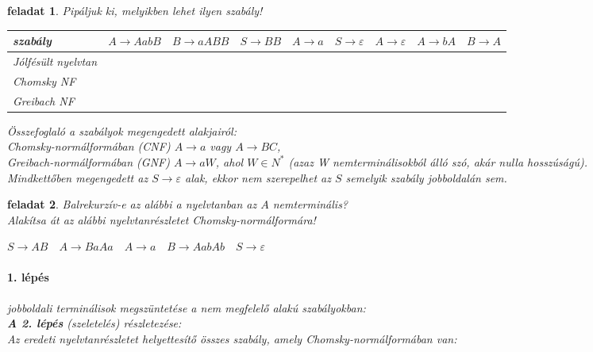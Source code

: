 \documentclass[a4paper]{article}
\newtheorem{feladat}{feladat}[section]
\begin{document}
\newpage
\begin{feladat}{}
    Pipáljuk ki, melyikben lehet ilyen szabály!

    \begin{tabular}{l*{8}{r}}
	szabály&
	$A\rightarrow AabB$&
	$B\rightarrow aABB$&
	$S\rightarrow BB$&
	$A\rightarrow a$&
	$S\rightarrow \varepsilon$&
	$A\rightarrow \varepsilon$&
	$A\rightarrow bA$&
	$B\rightarrow A$\\
	\hline
	Jólfésült nyelvtan&&&&&&&&\\
	Chomsky NF&&&&&&&&\\
	Greibach NF&&&&&&&&\\
	\hline
    \end{tabular}

Összefoglaló a szabályok megengedett alakjairól:\\
\emph{Chomsky}-normálformában (CNF) $A\rightarrow a$ vagy $A\rightarrow BC$,\\
\emph{Greibach}-normálformában (GNF) $A\rightarrow aW$, ahol $W \in
N^{*}$ (azaz W nemterminálisokból álló szó, akár nulla hosszúságú).\\
Mindkettőben megengedett az $S\rightarrow \varepsilon$ alak, ekkor nem
szerepelhet az $S$ semelyik szabály jobboldalán sem.
\end{feladat}

\begin{feladat}{}
    Balrekurzív-e az alábbi a nyelvtanban az $A$ nemterminális?\\[2em]
    Alakítsa át az alábbi nyelvtanrészletet Chomsky-normálformára!

    $S\rightarrow AB\quad
    A\rightarrow BaAa\quad
    A\rightarrow a\quad
    B\rightarrow AabAb\quad
    S\rightarrow \varepsilon$

    \paragraph{1. lépés} jobboldali terminálisok megszüntetése a nem megfelelő
    alakú szabályokban:\\[10em]

    \textbf{A 2. lépés} (szeletelés) részletezése:\\[15em]

    Az eredeti nyelvtanrészletet helyettesítő összes szabály, amely
    Chomsky-normálformában van:\\[10em]
\end{feladat}

\newpage

\newpage
\tableofcontents
\end{document}
